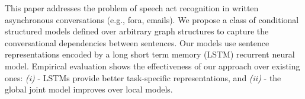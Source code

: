 This paper addresses the problem of speech act recognition in written asynchronous conversations (e.g., fora, emails). We propose a class of conditional structured models defined over arbitrary graph structures to capture the conversational dependencies between sentences. Our models use sentence representations encoded by a long short term memory (LSTM) recurrent neural model. Empirical evaluation shows the effectiveness of our approach over existing ones: {\em (i)} - LSTMs provide better task-specific representations, and {\em (ii)} - the global joint model improves over local models.

